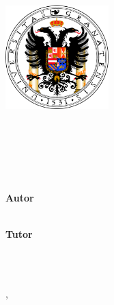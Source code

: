 \begin{titlepage}
    \begin{addmargin}[-1cm]{-3cm}
    \begin{center}
        \large

        \hfill

        \vfill

        \includegraphics[width=4cm]{gfx/logo_ugr2} %

        \vfill

        \spacedallcaps{\mySubtitle} \\ \bigskip

        \spacedlowsmallcaps{\myDegree} \\ \bigskip \bigskip


        \begingroup
            \color{Maroon}\spacedallcaps{\LARGE\myTitle} \\ \bigskip
        \endgroup

        \vfill

        \textbf{Autor} \\
        \myName \\ \medskip

        \textbf{Tutor} \\
        \myProf \\ \medskip

        \vfill

        \spacedlowsmallcaps{\myUni} \\ \medskip

        \myLocation, \myTime %

        \vfill

    \end{center}
  \end{addmargin}
\end{titlepage}
